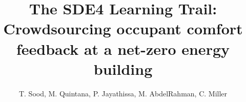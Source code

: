 \documentclass[a4paper]{jpconf} %
\begin{document}



\title{The SDE4 Learning Trail: Crowdsourcing occupant comfort feedback at a net-zero energy building} 

 \author{ T. Sood, M. Quintana, P. Jayathissa, M. AbdelRahman, C. Miller}

 \address{Building and Urban Data Science (BUDS) Group,  Department of Building, School of Design and Environment (SDE), National University of Singapore (NUS), Singapore 117566}








\end{document}
